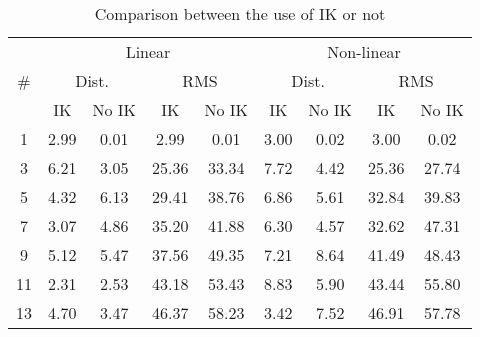 \begin{table}[ht]
\scriptsize
  \caption{Comparison between the use of IK or not}
  \centering
  \begin{tabular}{ccccc|cccc}
  \hline
  & \multicolumn{4}{c}{Linear} & \multicolumn{4}{c}{Non-linear}\\
  \multicolumn{1}{c}{\#} & \multicolumn{2}{c}{Dist.} & \multicolumn{2}{c}{RMS} & \multicolumn{2}{c}{Dist.} & \multicolumn{2}{c}{RMS}\\
  \multicolumn{1}{l}{}  & IK & No IK & IK & No IK & IK & No IK & IK & No IK \\ \hline
  1   & 2.99 & 0.01 & 2.99 & 0.01 & 3.00 & 0.02 & 3.00 & 0.02  \\
  3   & 6.21 & 3.05 & 25.36 & 33.34 & 7.72 & 4.42 & 25.36 & 27.74 \\
  5   & 4.32 & 6.13 & 29.41 & 38.76 & 6.86 & 5.61 & 32.84 & 39.83 \\
  7   & 3.07 & 4.86 & 35.20 & 41.88 & 6.30 & 4.57 & 32.62 & 47.31 \\
  9   & 5.12 & 5.47 & 37.56 & 49.35 & 7.21 & 8.64 & 41.49 & 48.43 \\
  11  & 2.31 & 2.53 & 43.18 & 53.43 & 8.83 & 5.90 & 43.44 & 55.80 \\
  13  & 4.70 & 3.47 & 46.37 & 58.23 & 3.42 & 7.52 & 46.91 & 57.78 \\
  \hline
  \end{tabular}
  \label{tab:IK_comparison}
\end{table}

